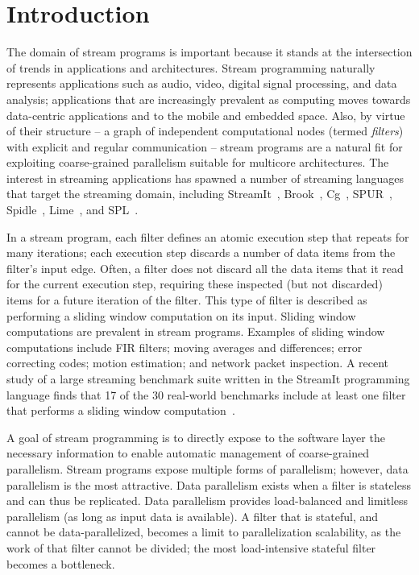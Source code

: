\section{Introduction}

The domain of stream programs is important because it stands at the
intersection of trends in applications and architectures.  Stream
programming naturally represents applications such as audio, video,
digital signal processing, and data analysis; applications that are
increasingly prevalent as computing moves towards data-centric
applications and to the mobile and embedded space.  Also, by virtue of
their structure -- a graph of independent computational nodes (termed
{\it filters}) with explicit and regular communication -- stream
programs are a natural fit for exploiting coarse-grained parallelism
suitable for multicore architectures.  The interest in streaming
applications has spawned a number of streaming languages that target
the streaming domain, including StreamIt~\cite{streamitcc},
Brook~\cite{brook04}, Cg~\cite{cg03},
SPUR~\cite{spur05samos}, Spidle~\cite{spidle03}, Lime~\cite{lime10},
and SPL~\cite{spl09}.

In a stream program, each filter defines an atomic execution step that
repeats for many iterations; each execution step discards a number of
data items from the filter's input edge.  Often, a filter does not
discard all the data items that it read for the current execution
step, requiring these inspected (but not discarded) items for a future
iteration of the filter.  This type of filter is described as
performing a sliding window computation on its input. Sliding window
computations are prevalent in stream programs.  Examples of sliding
window computations include FIR filters; moving averages and
differences; error correcting codes; motion estimation; and network
packet inspection.  A recent study of a large streaming benchmark
suite written in the StreamIt programming language finds that 17 of
the 30 real-world benchmarks include at least one filter that performs
a sliding window computation~\cite{streamit-suite}.

A goal of stream programming is to directly expose to the software
layer the necessary information to enable automatic management of
coarse-grained parallelism.  Stream programs expose multiple forms of
parallelism; however, data parallelism is the most attractive.  Data
parallelism exists when a filter is stateless and can thus be
replicated.  Data parallelism provides load-balanced and limitless
parallelism (as long as input data is available).  A filter that is
stateful, and cannot be data-parallelized, becomes a limit to
parallelization scalability, as the work of that filter cannot be
divided; the most load-intensive stateful filter becomes a bottleneck.

